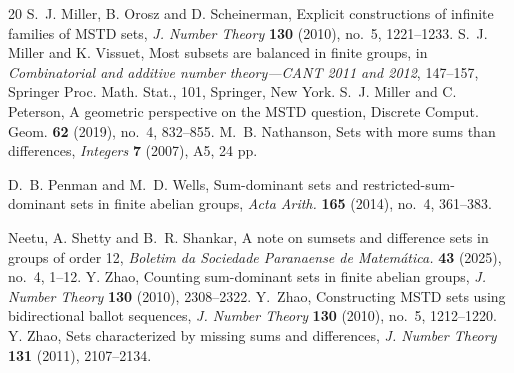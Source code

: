\documentclass[11pt,reqno]{amsart}
\numberwithin{equation}{section}
\begin{document}
\begin{thebibliography}{20}
S.~J. Miller, B. Orosz and D. Scheinerman, Explicit constructions of infinite families of MSTD sets, {\it J. Number Theory} {\bf 130} (2010), no.~5, 1221--1233.
S.~J. Miller and K. Vissuet, Most subsets are balanced in finite groups, in {\it Combinatorial and additive number theory---CANT 2011 and 2012}, 147--157, Springer Proc. Math. Stat., 101, Springer, New York.
S.~J. Miller and C. Peterson, A geometric perspective on the MSTD question, Discrete Comput. Geom. {\bf 62} (2019), no.~4, 832--855.
M.~B. Nathanson, Sets with more sums than differences, {\it Integers} {\bf 7} (2007), A5, 24 pp.


 D.~B. Penman and M.~D. Wells, Sum-dominant sets and restricted-sum-dominant sets in finite abelian groups, {\it Acta Arith.} {\bf 165} (2014), no.~4, 361--383.

 Neetu, A. Shetty and B.~R. Shankar, A note on sumsets and difference sets in groups of order 12, {\it Boletim da Sociedade Paranaense de Matemática.} {\bf 43} (2025), no.~4, 1--12. 
 Y. Zhao, Counting sum-dominant sets in finite abelian groups, {\it J. Number Theory} {\bf 130} (2010), 2308--2322.
Y.~Zhao,
Constructing MSTD sets using bidirectional ballot sequences,
{\it J. Number Theory} {\bf 130} (2010), no.~5, 1212--1220.
 Y. Zhao, Sets characterized by missing sums and differences, {\it J. Number Theory} {\bf 131} (2011), 2107--2134.

\end{thebibliography}
\end{document}
